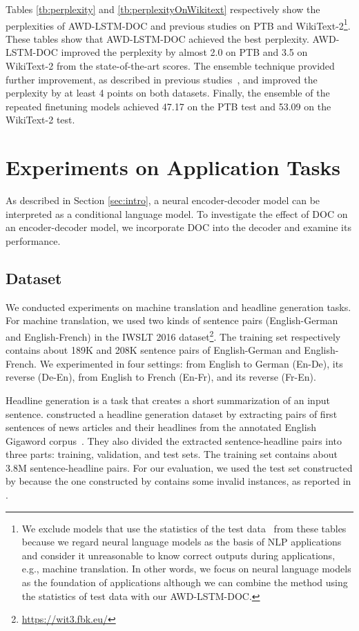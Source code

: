 \documentclass[11pt,a4paper]{article}
\begin{document}
Tables \ref{tb:perplexity} and \ref{tb:perplexityOnWikitext} respectively show the perplexities of AWD-LSTM-DOC and previous studies on PTB and WikiText-2\footnote{We exclude models that use the statistics of the test data~\cite{DBLP:journals/corr/GraveJU16,DBLP:journals/corr/abs-1709-07432} from these tables because we regard neural language models as the basis of NLP applications and consider it unreasonable to know correct outputs during applications, e.g., machine translation. In other words, we focus on neural language models as the foundation of applications although we can combine the method using the statistics of test data with our AWD-LSTM-DOC.}.
These tables show that AWD-LSTM-DOC achieved the best perplexity.
AWD-LSTM-DOC improved the perplexity by almost 2.0 on PTB and 3.5 on WikiText-2 from the state-of-the-art scores.
The ensemble technique provided further improvement, as described in previous studies~\cite{DBLP:journals/corr/ZarembaSV14,takase-suzuki-nagata:2017:I17-2}, and improved the perplexity by at least 4 points on both datasets.
Finally, the ensemble of the repeated finetuning models achieved 47.17 on the PTB test and 53.09 on the WikiText-2 test.



\section{Experiments on Application Tasks}
\label{sec:exp_generation}

As described in Section \ref{sec:intro}, a neural encoder-decoder model can be interpreted as a conditional language model.
To investigate the effect of DOC on an encoder-decoder model, we incorporate DOC into the decoder and examine its performance.

\subsection{Dataset}
We conducted experiments on machine translation and headline generation tasks.
For machine translation, we used two kinds of sentence pairs (English-German and English-French) in the IWSLT 2016 dataset\footnote{\href{https://wit3.fbk.eu/}{https://wit3.fbk.eu/}}.
The training set respectively contains about 189K and 208K sentence pairs of English-German and English-French.
We experimented in four settings: from English to German (En-De), its reverse (De-En), from English to French (En-Fr), and its reverse (Fr-En).

Headline generation is a task that creates a short summarization of an input sentence\cite{rush-chopra-weston:2015:EMNLP}.
 constructed a headline generation dataset by extracting pairs of first sentences of news articles and their headlines from the annotated English Gigaword corpus~\cite{Napoles:2012:AG:2391200.2391218}.
They also divided the extracted sentence-headline pairs into three parts: training, validation, and test sets.
The training set contains about 3.8M sentence-headline pairs.
For our evaluation, we used the test set constructed by  because the one constructed by  contains some invalid instances, as reported in .
\end{document}
